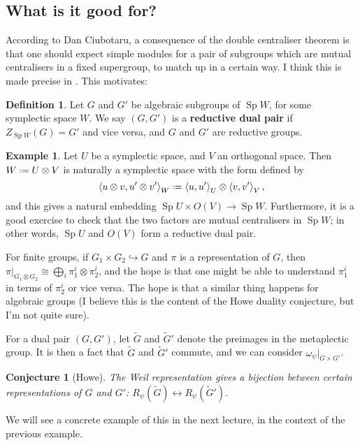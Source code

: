 \documentclass[11pt,a4paper,leqno]{article}
\newcommand{\1}{\mathbbm{1}}
\newcommand*{\defeq}{\mathrel{\vcenter{\baselineskip0.5ex \lineskiplimit0pt
      \hbox{\scriptsize.}\hbox{\scriptsize.}}}%
  =}
\renewcommand{\tilde}{\widetilde}
\DeclareMathOperator{\Sp}{Sp}
\theoremstyle{plain}
\newtheorem*{conj}{Conjecture}
\theoremstyle{definition}
\newtheorem{definition}[theorem]{Definition}
\newtheorem{example}[theorem]{Example}
\theoremstyle{remark}
\numberwithin{equation}{section}
\begin{document}
\subsection{What is it good for?}
According to Dan Ciubotaru, a consequence of the double centraliser
theorem is that one should expect simple modules for a pair of
subgroups which are mutual centralisers in a fixed supergroup, to
match up in a certain way. I think this is made precise in
\cite{howe1989}. This motivates:

\begin{definition}
  Let $G$ and $G'$ be algebraic subgroups of $\Sp W$, for some
  symplectic space $W$. We say $(G,G')$ is a \textbf{reductive dual
    pair}  if $Z_{\Sp W }(G) = G'$ and vice versa, and $G$ and $G'$
  are reductive groups.
\end{definition}

\begin{example}
  Let $U$ be a symplectic space, and $V$ an orthogonal space. Then $W
  \defeq U \otimes V$ is naturally a symplectic space with the form defined
  by
  \begin{equation}
    \label{eq:20}
\left\langle u \otimes v, u'\otimes v' \right\rangle_{W} \defeq \left\langle u,u' \right\rangle_{U} \otimes
\left\langle v,v' \right\rangle_{V}, 
  \end{equation}
  and this gives a natural embedding $\Sp U \times O(V) \to \Sp W$.
  Furthermore, it is a good exercise to check that the two factors are
  mutual centralisers in $\Sp W$; in other words, $\Sp U$ and $O(V)$
  form a reductive dual pair.
\end{example}
For finite groups, if $G_{1} \times G_{2} \hookrightarrow G$ and $\pi $ is a representation
of $G$, then $\pi|_{G_{1}\otimes G_{2}} \cong \bigoplus_{i} \pi_{1}^{i}\otimes\pi_{2}^{i}$,
and the hope is that one might be able to understand $\pi_{1}^{i}$ in
terms of $\pi_{2}^{i}$ or vice versa. The hope is that a similar thing
happens for algebraic groups (I believe this is the content of the
Howe duality conjecture, but I'm not quite sure).

For a dual pair $(G,G')$, let $\tilde G$ and $\tilde G'$ denote the
preimages in the metaplectic group. It is then a fact that $\tilde G$
and $\tilde G'$ commute, and we can consider $\omega_{\psi}|_{G\times G'}$.

\begin{conj}[Howe]
  The Weil representation gives a bijection between certain
  representations of $G$ and $G'$: $R_{\psi}(\tilde G) \leftrightarrow R_{\psi}(\tilde G')$.
\end{conj}
We will see a concrete example of this in the next lecture, in the
context of the previous example.
 
\end{document}
